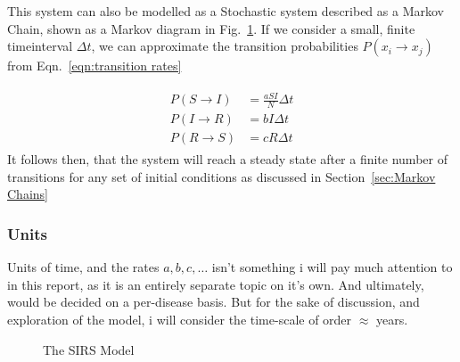 \documentclass[10pt,showpacs,preprintnumbers,amsmath,amssymb,nofootinbib,aps,prl,twocolumn,groupedaddress,superscriptaddress,showkeys]{revtex4-1}
\begin{document}
    This system can also be modelled as a Stochastic system described as a Markov Chain, shown as a Markov diagram in Fig.~\ref{fig:SIRS diagram}. If we consider a small, finite timeinterval $\Delta t$, we can approximate the transition probabilities $P(x_i \rightarrow x_j)$ from Eqn.~\ref{eqn:transition rates}

    \begin{align}
      \begin{split}
        P(S\rightarrow I) &= \frac{aSI}{N}\Delta t
          \\
        P(I\rightarrow R) &= bI\Delta t
          \\
        P(R\rightarrow S) &= cR\Delta t
      \end{split}
    \end{align}
    It follows then, that the system will reach a steady state after a finite number of transitions for any set of initial conditions as discussed in Section~\ref{sec:Markov Chains}

    \subsubsection{Units}
     Units of time, and the rates $a,b,c, \dots$ isn't something i will pay much attention to in this report, as it is an entirely separate topic on it's own. And ultimately, would be decided on a per-disease basis. But for the sake of discussion, and exploration of the model, i will consider the time-scale of order $\approx$ years.

    \begin{figure}[h!tb]
      \centering 
       \caption{The SIRS Model\label{fig:SIRS diagram}}
    \end{figure}
\end{document}
